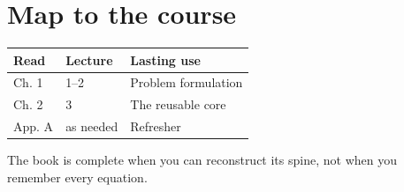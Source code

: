 \section*{Map to the course}

\begin{center}
\small
\begin{tabularx}{\textwidth}{@{}lXX@{}}
\toprule
\textbf{Read} & \textbf{Lecture} & \textbf{Lasting use} \\
\midrule
Ch. 1 & 1--2 & Problem formulation \\
Ch. 2 & 3 & The reusable core \\
App. A & as needed & Refresher \\
\bottomrule
\end{tabularx}
\end{center}

\begin{takeaway}
The book is complete when you can reconstruct its spine, not when you remember every
equation.
\end{takeaway}

